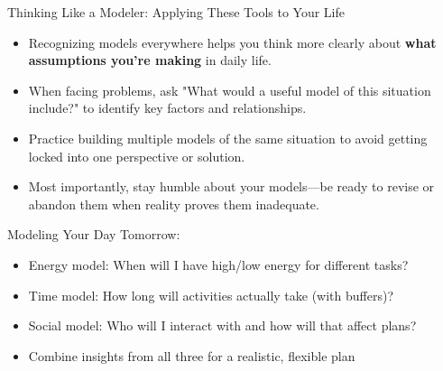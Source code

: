 \documentclass{beamer}
\begin{document}
\begin{frame}{Thinking Like a Modeler: Applying These Tools to Your Life}
	\begin{itemize}
		\item Recognizing models everywhere helps you think more clearly about \textbf{what assumptions you're making} in daily life.
		\item When facing problems, ask "What would a useful model of this situation include?" to identify key factors and relationships.
		\item Practice building multiple models of the same situation to avoid getting locked into one perspective or solution.
		\item Most importantly, stay humble about your models—be ready to revise or abandon them when reality proves them inadequate.
	\end{itemize}
	
	\begin{example}
		\scriptsize
		Modeling Your Day Tomorrow:
		\begin{itemize}
			\item Energy model: When will I have high/low energy for different tasks?
			\item Time model: How long will activities actually take (with buffers)?
			\item Social model: Who will I interact with and how will that affect plans?
			\item Combine insights from all three for a realistic, flexible plan
		\end{itemize}
	\end{example}

\end{frame}
\end{document}
